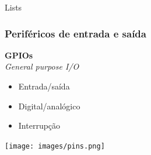 \documentclass[10pt, compress]{beamer}
\begin{document}

\begin{frame}{Lists}
  \frametitle{Periféricos de entrada e saída}
  \begin{center}
    \textbf{GPIOs} \\
    \textit{General purpose I/O}
    \begin{itemize}
      \item Entrada/saída
      \item Digital/analógico
      \item Interrupção
    \end{itemize}
    \texttt{[image: images/pins.png]}\\
  \end{center}
\end{frame}
\end{document}
